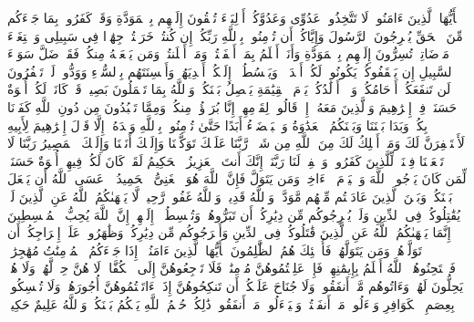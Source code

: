 \startbuffer[\q:60:1]
یَٰۤأَیُّهَا ٱلَّذِینَ ءَامَنُوا۟ لَا تَتَّخِذُوا۟ عَدُوِّی وَعَدُوَّكُمۡ أَوۡلِیَاۤءَ تُلۡقُونَ إِلَیۡهِم بِٱلۡمَوَدَّةِ وَقَدۡ كَفَرُوا۟ بِمَا جَاۤءَكُم مِّنَ ٱلۡحَقِّ یُخۡرِجُونَ ٱلرَّسُولَ وَإِیَّاكُمۡ أَن تُؤۡمِنُوا۟ بِٱللَّهِ رَبِّكُمۡ إِن كُنتُمۡ خَرَجۡتُمۡ جِهَٰدࣰا فِی سَبِیلِی وَٱبۡتِغَاۤءَ مَرۡضَاتِیۚ تُسِرُّونَ إِلَیۡهِم بِٱلۡمَوَدَّةِ وَأَنَا۠ أَعۡلَمُ بِمَاۤ أَخۡفَیۡتُمۡ وَمَاۤ أَعۡلَنتُمۡۚ وَمَن یَفۡعَلۡهُ مِنكُمۡ فَقَدۡ ضَلَّ سَوَاۤءَ ٱلسَّبِیلِ%
\stopbuffer%
\startbuffer[\q:60:2]
إِن یَثۡقَفُوكُمۡ یَكُونُوا۟ لَكُمۡ أَعۡدَاۤءࣰ وَیَبۡسُطُوۤا۟ إِلَیۡكُمۡ أَیۡدِیَهُمۡ وَأَلۡسِنَتَهُم بِٱلسُّوۤءِ وَوَدُّوا۟ لَوۡ تَكۡفُرُونَ%
\stopbuffer%
\startbuffer[\q:60:3]
لَن تَنفَعَكُمۡ أَرۡحَامُكُمۡ وَلَاۤ أَوۡلَٰدُكُمۡۚ یَوۡمَ ٱلۡقِیَٰمَةِ یَفۡصِلُ بَیۡنَكُمۡۚ وَٱللَّهُ بِمَا تَعۡمَلُونَ بَصِیرࣱ%
\stopbuffer%
\startbuffer[\q:60:4]
قَدۡ كَانَتۡ لَكُمۡ أُسۡوَةٌ حَسَنَةࣱ فِیۤ إِبۡرَٰهِیمَ وَٱلَّذِینَ مَعَهُۥۤ إِذۡ قَالُوا۟ لِقَوۡمِهِمۡ إِنَّا بُرَءَٰۤؤُا۟ مِنكُمۡ وَمِمَّا تَعۡبُدُونَ مِن دُونِ ٱللَّهِ كَفَرۡنَا بِكُمۡ وَبَدَا بَیۡنَنَا وَبَیۡنَكُمُ ٱلۡعَدَٰوَةُ وَٱلۡبَغۡضَاۤءُ أَبَدًا حَتَّىٰ تُؤۡمِنُوا۟ بِٱللَّهِ وَحۡدَهُۥۤ إِلَّا قَوۡلَ إِبۡرَٰهِیمَ لِأَبِیهِ لَأَسۡتَغۡفِرَنَّ لَكَ وَمَاۤ أَمۡلِكُ لَكَ مِنَ ٱللَّهِ مِن شَیۡءࣲۖ رَّبَّنَا عَلَیۡكَ تَوَكَّلۡنَا وَإِلَیۡكَ أَنَبۡنَا وَإِلَیۡكَ ٱلۡمَصِیرُ%
\stopbuffer%
\startbuffer[\q:60:5]
رَبَّنَا لَا تَجۡعَلۡنَا فِتۡنَةࣰ لِّلَّذِینَ كَفَرُوا۟ وَٱغۡفِرۡ لَنَا رَبَّنَاۤۖ إِنَّكَ أَنتَ ٱلۡعَزِیزُ ٱلۡحَكِیمُ%
\stopbuffer%
\startbuffer[\q:60:6]
لَقَدۡ كَانَ لَكُمۡ فِیهِمۡ أُسۡوَةٌ حَسَنَةࣱ لِّمَن كَانَ یَرۡجُوا۟ ٱللَّهَ وَٱلۡیَوۡمَ ٱلۡءَاخِرَۚ وَمَن یَتَوَلَّ فَإِنَّ ٱللَّهَ هُوَ ٱلۡغَنِیُّ ٱلۡحَمِیدُ%
\stopbuffer%
\startbuffer[\q:60:7]
۞ عَسَى ٱللَّهُ أَن یَجۡعَلَ بَیۡنَكُمۡ وَبَیۡنَ ٱلَّذِینَ عَادَیۡتُم مِّنۡهُم مَّوَدَّةࣰۚ وَٱللَّهُ قَدِیرࣱۚ وَٱللَّهُ غَفُورࣱ رَّحِیمࣱ%
\stopbuffer%
\startbuffer[\q:60:8]
لَّا یَنۡهَىٰكُمُ ٱللَّهُ عَنِ ٱلَّذِینَ لَمۡ یُقَٰتِلُوكُمۡ فِی ٱلدِّینِ وَلَمۡ یُخۡرِجُوكُم مِّن دِیَٰرِكُمۡ أَن تَبَرُّوهُمۡ وَتُقۡسِطُوۤا۟ إِلَیۡهِمۡۚ إِنَّ ٱللَّهَ یُحِبُّ ٱلۡمُقۡسِطِینَ%
\stopbuffer%
\startbuffer[\q:60:9]
إِنَّمَا یَنۡهَىٰكُمُ ٱللَّهُ عَنِ ٱلَّذِینَ قَٰتَلُوكُمۡ فِی ٱلدِّینِ وَأَخۡرَجُوكُم مِّن دِیَٰرِكُمۡ وَظَٰهَرُوا۟ عَلَىٰۤ إِخۡرَاجِكُمۡ أَن تَوَلَّوۡهُمۡۚ وَمَن یَتَوَلَّهُمۡ فَأُو۟لَٰۤئِكَ هُمُ ٱلظَّٰلِمُونَ%
\stopbuffer%
\startbuffer[\q:60:10]
یَٰۤأَیُّهَا ٱلَّذِینَ ءَامَنُوۤا۟ إِذَا جَاۤءَكُمُ ٱلۡمُؤۡمِنَٰتُ مُهَٰجِرَٰتࣲ فَٱمۡتَحِنُوهُنَّۖ ٱللَّهُ أَعۡلَمُ بِإِیمَٰنِهِنَّۖ فَإِنۡ عَلِمۡتُمُوهُنَّ مُؤۡمِنَٰتࣲ فَلَا تَرۡجِعُوهُنَّ إِلَى ٱلۡكُفَّارِۖ لَا هُنَّ حِلࣱّ لَّهُمۡ وَلَا هُمۡ یَحِلُّونَ لَهُنَّۖ وَءَاتُوهُم مَّاۤ أَنفَقُوا۟ۚ وَلَا جُنَاحَ عَلَیۡكُمۡ أَن تَنكِحُوهُنَّ إِذَاۤ ءَاتَیۡتُمُوهُنَّ أُجُورَهُنَّۚ وَلَا تُمۡسِكُوا۟ بِعِصَمِ ٱلۡكَوَافِرِ وَسۡءَلُوا۟ مَاۤ أَنفَقۡتُمۡ وَلۡیَسۡءَلُوا۟ مَاۤ أَنفَقُوا۟ۚ ذَٰلِكُمۡ حُكۡمُ ٱللَّهِ یَحۡكُمُ بَیۡنَكُمۡۖ وَٱللَّهُ عَلِیمٌ حَكِیمࣱ%
